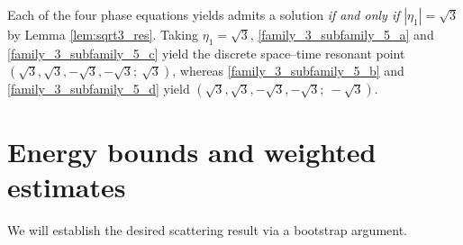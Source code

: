 \documentclass[reqno,english,11pt]{amsart}
\theoremstyle{definition}
\numberwithin{equation}{section}
\begin{document}
Each of the four phase equations yields admits a solution \textit{if and only if} $|\eta_1|=\sqrt3$  by Lemma \ref{lem:sqrt3_res}. Taking $\eta_1=\sqrt3$, \eqref{family_3_subfamily_5_a} and \eqref{family_3_subfamily_5_c} yield the discrete space--time resonant point $(\sqrt3,\sqrt3,-\sqrt3,-\sqrt3;\ \sqrt3)$, whereas \eqref{family_3_subfamily_5_b} and \eqref{family_3_subfamily_5_d} yield $(\sqrt3,\sqrt3,-\sqrt3,-\sqrt3;\ -\sqrt3)$.



\section{Energy bounds and weighted estimates}

We will establish the desired scattering result via a bootstrap argument.
\end{document}
